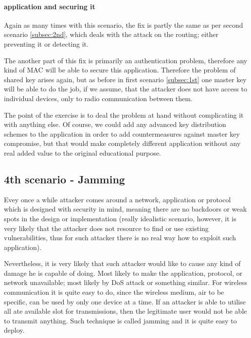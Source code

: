 \documentclass[
  print, %
  table,   %
  nolof,     %
  nolot,     %
           oneside
]{fithesis3}
\begin{document}
    \paragraph{application and securing it}
    Again as many times with this scenario, the fix is partly the same as per second scenario \ref{subsec:2nd}, which deals with the attack on the routing; either preventing it or detecting it.

    The another part of this fix is primarily an authentication problem, therefore any kind of MAC will be able to secure this application. Therefore the problem of shared key arises again, but as before in first scenario \ref{subsec:1st} one master key will be able to do the job, if we assume, that the attacker does not have access to individual devices, only to radio communication between them.

    The point of the exercise is to deal the problem at hand without complicating it with anything else. Of course, we could add any advanced key distribution schemes  %
    to the application in order to add countermeasures against master key compromise, but that would make completely different application without any real added value to the original educational purpose.

    \subsection{4th scenario - Jamming} \label{subsec:4th}
    Evey once a while attacker comes around a network, application or protocol which is designed with security in mind, meaning there are no backdoors or weak spots in the design or implementation (really idealistic scenario, however, it is very likely that the attacker does not resource to find or use existing vulnerabilities, thus for such attacker there is no real way how to exploit such application).

    Nevertheless, it is very likely that such attacker would like to cause any kind of damage he is capable of doing. Most likely to make the application, protocol, or network unavailable; most likely by DoS attack %
    or something similar. For wireless communication it is quite easy to do, since the wireless medium, air to be specific, can be used by only one device at a time. If an attacker is able to utilise all ate available slot for transmissions, then the legitimate user would not be able to transmit anything. Such technique is called jamming and it is quite easy to deploy.
\end{document}
